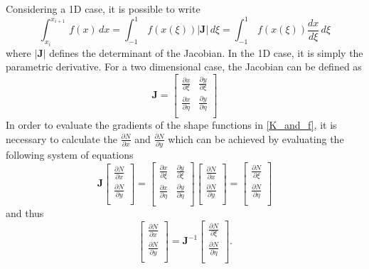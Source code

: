 %
Considering a 1D case, it is possible to write 
\begin{equation} \label{iso_definition}
    \int^{x_{i+1}}_{x_{i}} \, f(x)\,dx = \int^{1}_{-1} \, f(x(\xi))|\boldsymbol{J}|\, d\xi =
    \int^{1}_{-1}\, f(x(\xi)) \frac{dx}{d\xi}\,d\xi
\end{equation}
where $|\boldsymbol{J}|$ defines the determinant of the Jacobian. In the 1D case, it is simply the parametric derivative. 
For a two dimensional case, the Jacobian can be defined as
\begin{equation} \label{jacobian_determinant}
    \boldsymbol{J} = \begin{bmatrix}
        \frac{\partial x}{\partial \xi} & \frac{\partial y}{\partial \xi}\\
        \frac{\partial x}{\partial \eta} & \frac{\partial y}{\partial \eta}\\
    \end{bmatrix}
\end{equation}
In order to evaluate the gradients of the shape functions in \eqref{K_and_f}, it is necessary to calculate the $\frac{\partial N}{\partial x}$ and $\frac{\partial N}{\partial y}$ 
 which can be achieved by evaluating the following system of equations
 \begin{equation}
    \boldsymbol{J} \begin{bmatrix}
        \frac{\partial N}{\partial x}\\
        \frac{\partial N}{\partial y}\\
    \end{bmatrix} 
    =
    \begin{bmatrix}
        \frac{\partial x}{\partial \xi} & \frac{\partial y}{\partial \xi}\\
        \frac{\partial x}{\partial \eta} & \frac{\partial y}{\partial \eta}\\
    \end{bmatrix}
    \begin{bmatrix}
        \frac{\partial N}{\partial x}\\
        \frac{\partial N}{\partial y}\\
    \end{bmatrix}
    =
    \begin{bmatrix}
        \frac{\partial N}{\partial \xi}\\
        \frac{\partial N}{\partial \eta}\\
    \end{bmatrix}
\end{equation}
and thus
\begin{equation}
    \begin{bmatrix}
        \frac{\partial N}{\partial x}\\
        \frac{\partial N}{\partial y}\\
    \end{bmatrix}
    = \boldsymbol{J}^{-1}
    \begin{bmatrix}
        \frac{\partial N}{\partial \xi}\\
        \frac{\partial N}{\partial \eta}\\
    \end{bmatrix}.
\end{equation}

